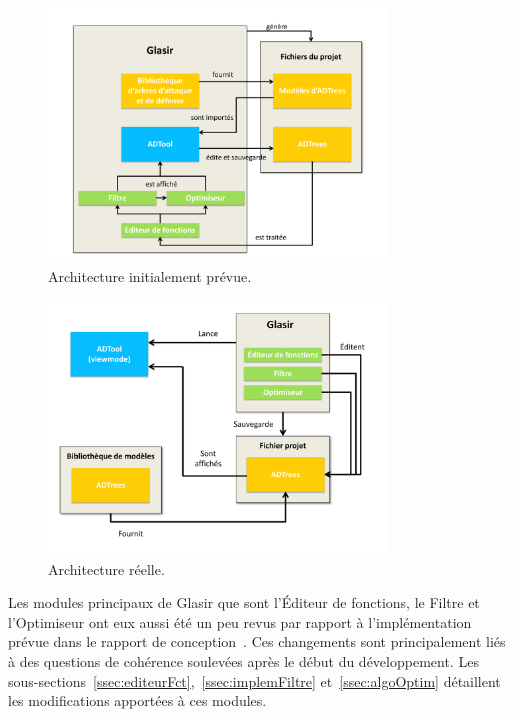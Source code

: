 		\begin{figure}[H]
            \centering
                \includegraphics[width=0.8\textwidth]{figure/archiGlasir.pdf}
            \caption{Architecture initialement prévue.}
            \label{fig:archiPrevue}
        \end{figure}
	
        
        \begin{figure}[H]
            \centering
                \includegraphics[width=0.8\textwidth]{figure/archiReelle.pdf}
            \caption{Architecture réelle.}
            \label{fig:archiReelle}
        \end{figure}
        
Les modules principaux de Glasir que sont l'Éditeur de fonctions, le Filtre et l'Optimiseur ont eux aussi été un peu revus par rapport à l'implémentation prévue dans le rapport de conception~\cite{conception}. Ces changements sont principalement liés à des questions de cohérence soulevées après le début du développement. Les {\sc sous-sections}~\ref{ssec:editeurFct},~\ref{ssec:implemFiltre} et~\ref{ssec:algoOptim} détaillent les modifications apportées à ces modules.

